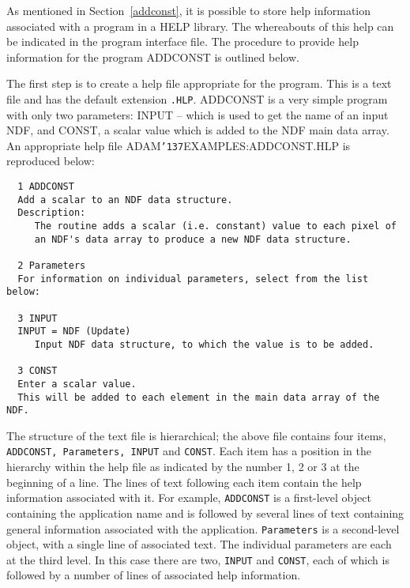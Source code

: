 \documentclass[twoside,11pt]{article}
\renewcommand{\_}{{\tt\char'137}}
\begin{document}
As mentioned in Section~\ref{addconst}, it is possible to store help
information associated with a program in a HELP library.
The whereabouts of this help can be indicated in the program interface file.
The procedure to provide help information for the program
ADDCONST is outlined below.

The first step is to create a help file appropriate for the  program.
This is a text file and has the default extension {\tt .HLP}.
ADDCONST is a very simple program with only two parameters: INPUT -- which
is used to  get the name of an input NDF, and CONST,
a scalar value which is added to the NDF main data array.
An appropriate  help file ADAM\_EXAMPLES:ADDCONST.HLP is reproduced below:
\begin{verbatim}
  1 ADDCONST
  Add a scalar to an NDF data structure.
  Description:
     The routine adds a scalar (i.e. constant) value to each pixel of
     an NDF's data array to produce a new NDF data structure.

  2 Parameters
  For information on individual parameters, select from the list below:

  3 INPUT
  INPUT = NDF (Update)
     Input NDF data structure, to which the value is to be added.

  3 CONST
  Enter a scalar value.
  This will be added to each element in the main data array of the NDF.
\end{verbatim}
The structure of the text file is hierarchical;
the above file contains four items, {\tt ADDCONST, Parameters, INPUT} and
{\tt CONST}.
Each item has a position in the hierarchy within the
help file  as indicated by the number 1, 2
or 3 at the beginning of a line.
The lines of text following each item contain the help information
associated with it.
For example, {\tt ADDCONST} is a first-level object containing the application name
and is followed by several lines of text containing general information
associated with the application.
{\tt Parameters} is a second-level object, with a single line of associated text.
The individual parameters are each at the third level.
In this case there are two, {\tt INPUT} and {\tt CONST}, each of which
is followed by a number of lines of associated help
information.
\end{document}
